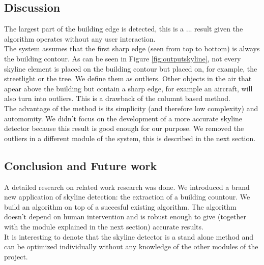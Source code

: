 

\subsection{Discussion}  %
The largest part of the building edge is detected, this is a ...
result given
the algorithm operates without any user interaction.\\
The system assumes that the first sharp edge (seen from top to bottom) is always
the building contour. As can be seen in Figure \ref{fig:outputskyline}, not
every skyline element is placed on the building contour but placed on, for
example, the streetlight or the tree. We define them as outliers.
Other objects in the air that apear above the building but contain a sharp edge,
for example an aircraft, will also turn into outliers.  This is a drawback of the
	columnt based method.\\
The advantage of the method is its simplicity (and therefore low complexity) and
automomity.  We didn't focus on the development of a more accurate skyline
detector because this result is good enough for our purpose. We removed the
outliers in a different module of the system, this is described in the next
section.  








\subsection{Conclusion and Future work}
A detailed research on related work research was done.
We introduced a brand new application of skyline detection: the extraction of a
building countour. We build an algorithm on top of a succesful existing
algorithm.  The algorithm doesn't depend on human intervention and is robust enough to give
(together with the module explained in the next section) accurate results.\\
It is interesting to denote that the skyline detector is a stand alone method and
can be optimized individually without any knowledge of the other modules of the
project.\\

